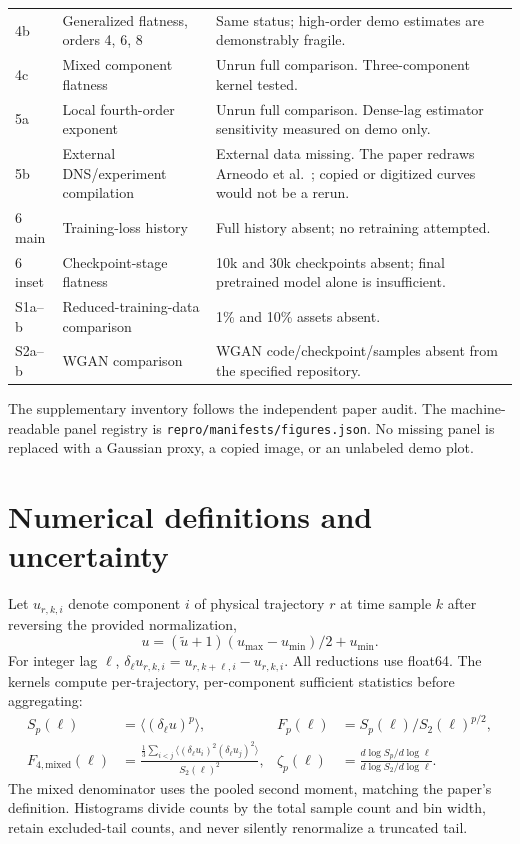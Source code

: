 \documentclass[10pt,a4paper]{article}
\begin{document}
\begin{longtable}{L{15mm}L{47mm}L{85mm}}
4b & Generalized flatness, orders 4, 6, 8 & Same status; high-order demo estimates are demonstrably fragile.\\
4c & Mixed component flatness & Unrun full comparison. Three-component kernel tested.\\
5a & Local fourth-order exponent & Unrun full comparison. Dense-lag estimator sensitivity measured on demo only.\\
5b & External DNS/experiment compilation & External data missing. The paper redraws Arneodo et al.\ \cite{arneodo}; copied or digitized curves would not be a rerun.\\
6 main & Training-loss history & Full history absent; no retraining attempted.\\
6 inset & Checkpoint-stage flatness & 10k and 30k checkpoints absent; final pretrained model alone is insufficient.\\
S1a--b & Reduced-training-data comparison & 1\% and 10\% assets absent.\\
S2a--b & WGAN comparison & WGAN code/checkpoint/samples absent from the specified repository.\\
\bottomrule
\end{longtable}
\normalsize
The supplementary inventory follows the independent paper audit. The machine-readable panel registry is \texttt{repro/manifests/figures.json}. No missing panel is replaced with a Gaussian proxy, a copied image, or an unlabeled demo plot.

\section{Numerical definitions and uncertainty}
Let $u_{r,k,i}$ denote component $i$ of physical trajectory $r$ at time sample $k$ after reversing the provided normalization,
\begin{equation}
u=(\tilde u+1)(u_{\max}-u_{\min})/2+u_{\min}.
\end{equation}
For integer lag $\ell$, $\delta_\ell u_{r,k,i}=u_{r,k+\ell,i}-u_{r,k,i}$. All reductions use float64. The kernels compute per-trajectory, per-component sufficient statistics before aggregating:
\begin{align}
S_p(\ell)&=\langle(\delta_\ell u)^p\rangle,&
F_p(\ell)&=S_p(\ell)/S_2(\ell)^{p/2},\\
F_{4,\mathrm{mixed}}(\ell)&=\frac{\frac13\sum_{i<j}\langle(\delta_\ell u_i)^2(\delta_\ell u_j)^2\rangle}{S_2(\ell)^2},&
\zeta_p(\ell)&=\frac{d\log S_p/d\log\ell}{d\log S_2/d\log\ell}.
\end{align}
The mixed denominator uses the pooled second moment, matching the paper's definition. Histograms divide counts by the total sample count and bin width, retain excluded-tail counts, and never silently renormalize a truncated tail.
\end{document}
